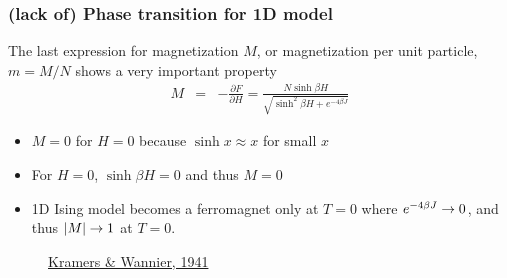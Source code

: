 \documentclass[hyperref={colorlinks=true}]{beamer}
\begin{document}
\begin{frame}%
  \frametitle{(lack of) Phase transition for 1D model}

  The last expression for magnetization $M$, or magnetization per unit particle, $m=M/N$ shows a very important property
  \begin{eqnarray}
           M &=& -\frac{\partial F}{\partial H} = \frac{N \sinh \beta H}{\sqrt{\sinh^2 \beta H + e^{-4 \beta J}}} 
  \end{eqnarray}
  \begin{itemize}
    \item $M=0$ for $H=0$ because $\sinh x \approx x$ for small $x$
    \item For $H=0$, $\sinh \beta H = 0$ and thus $M = 0$
    \item 1D Ising model becomes a ferromagnet only at $T =0$ where $e^{-4 \beta J} \rightarrow 0$, and thus $|M| \rightarrow 1$ at $T =0$.
  \end{itemize}
  
  \pause
  
  \begin{ucblock}{}
  \centering {} 
  \end{ucblock}
  \pause
  \begin{figure}
    \center 
    \href{https://journals.aps.org/pr/abstract/10.1103/PhysRev.60.252}{Kramers \& Wannier, 1941}
  \end{figure}
  

\end{frame}
\end{document}
